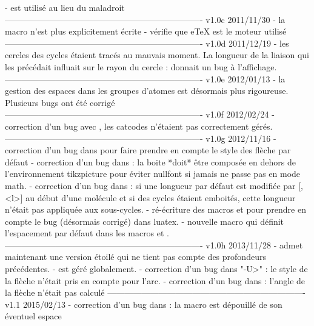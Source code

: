     - \box\z@ est utilis\'e au lieu du maladroit \unhbox\z@
----------------------------------------------------------------------
v1.0c      2011/11/30
    - la macro \+ n'est plus explicitement \'ecrite
    - v\'erifie que eTeX est le moteur utilis\'e
----------------------------------------------------------------------
v1.0d      2011/12/19
    - les cercles des cycles \'etaient trac\'es au mauvais moment. La
      longueur de la liaison qui les pr\'ec\'edait influait sur le
      rayon du cercle :  donnait un bug
      \`a l'affichage.
----------------------------------------------------------------------
v1.0e      2012/01/13
    - la gestion des espaces dans les groupes d'atomes est
      d\'esormais plus rigoureuse. Plusieurs bugs ont \'et\'e
      corrig\'e
----------------------------------------------------------------------
v1.0f      2012/02/24
    - correction d'un bug avec , les catcodes n'\'etaient
      pas correctement g\'er\'es.
----------------------------------------------------------------------
v1.0g      2012/11/16
    - correction d'un bug dans \CF@direct@arrow pour faire prendre en
      compte le style des fl\`eche par d\'efaut
    - correction d'un bug dans \CF@lewis@c : la boite *doit* \^etre
      compos\'ee en dehors de l'environnement tikzpicture pour
      \'eviter nullfont si jamais \printatom ne passe pas en mode
      math.
    - correction d'un bug dans \CF@chemfig@e : si une longueur par
      d\'efaut est modifi\'ee par [,<l>] au d\'ebut d'une mol\'ecule
      et si des cycles \'etaient emboit\'es, cette longueur n'\'etait
      pas appliqu\'ee aux sous-cycles.
    - r\'e-\'ecriture des macros \chemabove et \chembemow pour
      prendre en compte le bug (d\'esormais corrig\'e) dans luatex.
    - nouvelle macro \setstacksep qui d\'efinit l'espacement par
      d\'efaut dans les macros \chemabove et \chembelow.
----------------------------------------------------------------------
v1.0h      2013/11/28
    - \chemname admet maintenant une version \'etoil\'e qui ne tient
      pas compte des profondeurs pr\'ec\'edentes.
    - \CF@dp@max est g\'er\'e globalement.
    - correction d'un bug dans "-U>" : le style de la fl\`eche
      n'\'etait pris en compte pour l'arc.
    - correction d'un bug dans \CF@direct@arrow : l'angle de la
      fl\`eche n'\'etait pas calcul\'e
----------------------------------------------------------------------
v1.1       2015/02/13
    - correction d'un bug dans \CF@seek@submol : la macro
      \CF@remain@molecule est d\'epouill\'e de son \'eventuel espace
